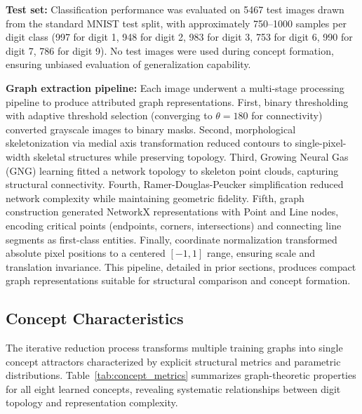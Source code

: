\documentclass[runningheads]{llncs}
\begin{document}
\textbf{Test set:} Classification performance was evaluated on 5467 test images drawn from the standard MNIST test split, with approximately 750--1000 samples per digit class (997 for digit 1, 948 for digit 2, 983 for digit 3, 753 for digit 6, 990 for digit 7, 786 for digit 9). No test images were used during concept formation, ensuring unbiased evaluation of generalization capability.

\textbf{Graph extraction pipeline:} Each image underwent a multi-stage processing pipeline to produce attributed graph representations. First, binary thresholding with adaptive threshold selection (converging to $\theta = 180$ for connectivity) converted grayscale images to binary masks. Second, morphological skeletonization via medial axis transformation reduced contours to single-pixel-width skeletal structures while preserving topology. Third, Growing Neural Gas (GNG) learning fitted a network topology to skeleton point clouds, capturing structural connectivity. Fourth, Ramer-Douglas-Peucker simplification reduced network complexity while maintaining geometric fidelity. Fifth, graph construction generated NetworkX representations with Point and Line nodes, encoding critical points (endpoints, corners, intersections) and connecting line segments as first-class entities. Finally, coordinate normalization transformed absolute pixel positions to a centered $[-1, 1]$ range, ensuring scale and translation invariance. This pipeline, detailed in prior sections, produces compact graph representations suitable for structural comparison and concept formation.

\subsection{Concept Characteristics}

The iterative reduction process transforms multiple training graphs into single concept attractors characterized by explicit structural metrics and parametric distributions. Table~\ref{tab:concept_metrics} summarizes graph-theoretic properties for all eight learned concepts, revealing systematic relationships between digit topology and representation complexity.
\end{document}
